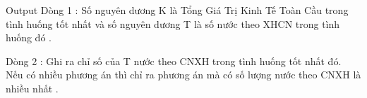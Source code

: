 Output
Dòng 1 : Số nguyên dương K là Tổng Giá Trị Kinh Tế Toàn Cầu trong tình huống tốt nhất và số nguyên dương T là số nước theo XHCN trong tình huống đó .   


   Dòng 2 : Ghi ra chỉ số của T nước theo CNXH trong tình huống tốt nhất đó. Nếu có nhiều phương án thì chỉ ra phương án mà có số lượng nước theo CNXH là nhiều nhất .